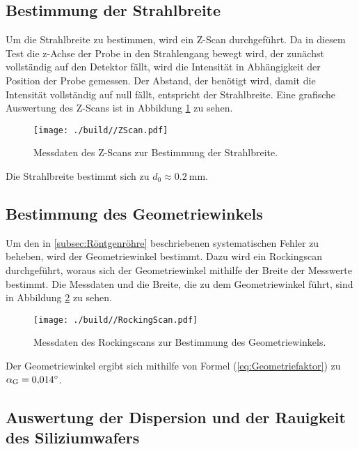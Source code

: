 \subsection{Bestimmung der Strahlbreite}
\label{subsec:Strahlbreite}

Um die Strahlbreite zu bestimmen, wird ein Z-Scan durchgeführt.
Da in diesem Test die z-Achse der Probe in den Strahlengang bewegt wird, der zunächst vollständig auf den Detektor fällt, wird die Intensität in Abhängigkeit der Position der Probe gemessen.
Der Abstand, der benötigt wird, damit die Intensität vollständig auf null fällt, entspricht der Strahlbreite.
Eine grafische Auswertung des Z-Scans ist in Abbildung \ref{fig:ZScan} zu sehen.
\begin{figure}[H]
    \centering
    \texttt{[image: ./build//ZScan.pdf]}
    \caption{Messdaten des Z-Scans zur Bestimmung der Strahlbreite.}
    \label{fig:ZScan}
\end{figure}
\noindent
Die Strahlbreite bestimmt sich zu $d_0\approx\SI{0.2}{\milli\meter}$.

\subsection{Bestimmung des Geometriewinkels}
\label{subsec:Geometriewinkel}

Um den in \autoref{subsec:Röntgenröhre} beschriebenen systematischen Fehler zu beheben, wird der Geometriewinkel bestimmt.
Dazu wird ein Rockingscan durchgeführt, woraus sich der Geometriewinkel mithilfe der Breite der Messwerte bestimmt.
Die Messdaten und die Breite, die zu dem Geometriewinkel führt, sind in Abbildung \ref{fig:RockingScan} zu sehen.
\begin{figure}[H]
    \centering
    \texttt{[image: ./build//RockingScan.pdf]}
    \caption{Messdaten des Rockingscans zur Bestimmung des Geometriewinkels.}
    \label{fig:RockingScan}
\end{figure}
\noindent
Der Geometriewinkel ergibt sich mithilfe von Formel (\ref{eq:Geometriefaktor}) zu $\alpha_{\text G} = \SI{0.014}{\degree}$.

\subsection{Auswertung der Dispersion und der Rauigkeit des Siliziumwafers}
\label{subsec:Dispersion}

